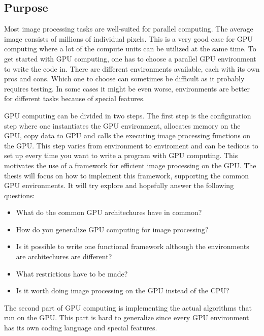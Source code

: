 \subsection{Purpose}

Most image processing tasks are well-suited for parallel computing. The average image consists of millions of individual pixels. This is a very good case for GPU computing where a lot of the compute units can be utilized at the same time. To get started with GPU computing, one has to choose a parallel GPU environment to write the code in. There are different environments available, each with its own pros and cons. Which one to choose can sometimes be difficult as it probably requires testing. In some cases it might be even worse, environments are better for different tasks because of special features. 
\newline

GPU computing can be divided in two steps. The first step is the configuration step where one instantiates the GPU environment, allocates memory on the GPU, copy data to GPU and calls the executing image processing functions on the GPU. This step varies from environment to enviroment and can be tedious to set up every time you want to write a program with GPU computing. This motivates the use of a framework for efficient image processing on the GPU. The thesis will focus on how to implement this framework, supporting the common GPU environments. It will try explore and hopefully answer the following questions:
\newline

\begin{itemize}
\item{What do the common GPU architechures have in common?}
\item{How do you generalize GPU computing for image processing?}
\item{Is it possible to write one functional framework although the environments are architechures are different?}
\item{What restrictions have to be made?}
\item{Is it worth doing image processing on the GPU instead of the CPU?}
\end{itemize}

The second part of GPU computing is implementing the actual algorithms that run on the GPU. This part is hard to generalize since every GPU environment has its own coding language and special features. 
\newline

